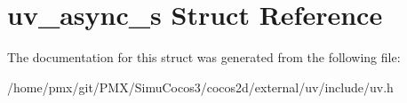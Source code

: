 \hypertarget{structuv__async__s}{}\section{uv\+\_\+async\+\_\+s Struct Reference}
\label{structuv__async__s}


The documentation for this struct was generated from the following file\+:\begin{DoxyCompactItemize}
\item 
/home/pmx/git/\+P\+M\+X/\+Simu\+Cocos3/cocos2d/external/uv/include/uv.\+h\end{DoxyCompactItemize}
